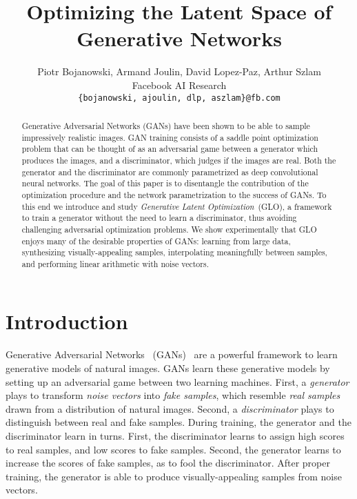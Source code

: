 \documentclass{article}
\title{Optimizing the Latent Space of Generative Networks}
\author{Piotr Bojanowski, Armand Joulin, David Lopez-Paz, Arthur Szlam\\
Facebook AI Research\\
\texttt{\{bojanowski, ajoulin, dlp, aszlam\}@fb.com}}
\newcommand{\GNAT}{GLO}
\begin{document}
\maketitle

\begin{abstract}
Generative Adversarial Networks (GANs) have been shown to be able to sample impressively realistic images.
  GAN training consists of a saddle point optimization problem that can be thought of as an adversarial game between a generator
which produces the images, and a discriminator, which judges if the images are real. Both the generator and the discriminator are commonly parametrized as
 deep convolutional neural networks.
The goal of this paper is to disentangle the contribution of the optimization procedure and the network parametrization to the success of GANs.
To this end we
introduce and study \emph{Generative Latent Optimization}~(\GNAT{}), a framework to
train a generator without the need
to learn a discriminator, thus avoiding challenging adversarial
optimization problems.  We show experimentally that
\GNAT{} enjoys many of the desirable properties of GANs: learning from large data,
synthesizing visually-appealing samples, interpolating meaningfully between
samples, and performing linear arithmetic with noise vectors.
\end{abstract}

\section{Introduction}\label{sec:introduction}
Generative Adversarial Networks~ (GANs)~\citep{gan} are a powerful framework to
learn generative models of natural images.  GANs learn these generative models
by setting up an adversarial game between two learning machines.  First, a
\emph{generator} plays to transform \emph{noise vectors} into \emph{fake
samples}, which resemble \emph{real samples} drawn from a distribution of
natural images.  Second, a \emph{discriminator} plays to distinguish between
real and fake samples.  During training, the generator and the discriminator
learn in turns.  First, the discriminator learns to assign high scores to real
samples, and low scores to fake samples.  Second, the generator learns to
increase the scores of fake samples, as to fool the discriminator. After proper
training, the generator is able to produce visually-appealing samples from
noise vectors.
\end{document}

